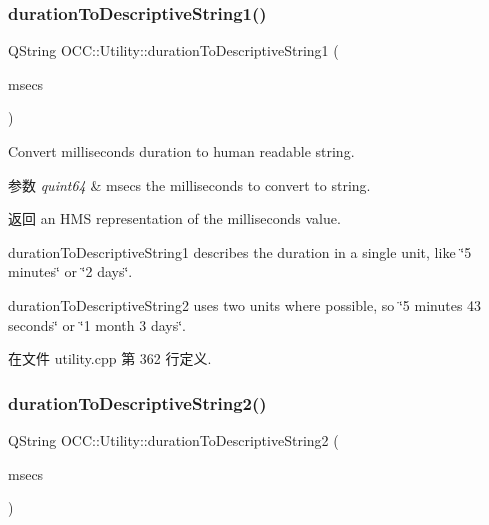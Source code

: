 \subsubsection{\texorpdfstring{duration\+To\+Descriptive\+String1()}{durationToDescriptiveString1()}}
{\footnotesize\ttfamily Q\+String O\+C\+C\+::\+Utility\+::duration\+To\+Descriptive\+String1 (\begin{DoxyParamCaption}\item[{quint64}]{msecs }\end{DoxyParamCaption})}



Convert milliseconds duration to human readable string. 


\begin{DoxyParams}{参数}
{\em quint64} & msecs the milliseconds to convert to string. \\
\hline
\end{DoxyParams}
\begin{DoxyReturn}{返回}
an H\+MS representation of the milliseconds value.
\end{DoxyReturn}
duration\+To\+Descriptive\+String1 describes the duration in a single unit, like \char`\"{}5 minutes\char`\"{} or \char`\"{}2 days\char`\"{}.

duration\+To\+Descriptive\+String2 uses two units where possible, so \char`\"{}5 minutes 43 seconds\char`\"{} or \char`\"{}1 month 3 days\char`\"{}. 

在文件 utility.\+cpp 第 362 行定义.

\mbox{\label{namespace_o_c_c_1_1_utility_a6ce540b22225886d8598b42d01358edb}} 
\subsubsection{\texorpdfstring{duration\+To\+Descriptive\+String2()}{durationToDescriptiveString2()}}
{\footnotesize\ttfamily Q\+String O\+C\+C\+::\+Utility\+::duration\+To\+Descriptive\+String2 (\begin{DoxyParamCaption}\item[{quint64}]{msecs }\end{DoxyParamCaption})}




